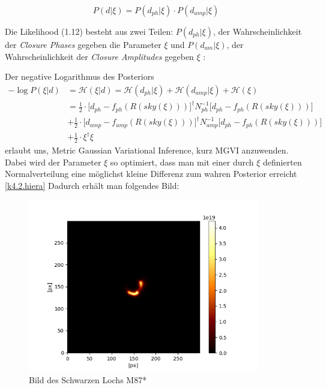 \begin{equation}
P(d|\xi)=  {P(d_{ph}|\xi)\cdot P(d_{amp}|\xi)}    
\end{equation}

Die Likelihood (1.12) besteht aus zwei Teilen: $P(d_{ph}|\xi)$, der Wahrscheinlichkeit der \emph{Closure Phases} gegeben die Parameter $\xi$ und $P(d_{am}| \xi)$, der Wahrscheinlichkeit der \emph{Closure Amplitudes} gegeben $\xi$ : 

Der negative Logarithmus des Posteriors
\begin{align} \label{k4.2.Posterior}
 -\log {P(\xi|d)} &= 
 \mathcal{H} (\xi|d) = \mathcal{H} (d_{ph}|\xi)+\mathcal{H} (d_{amp}|\xi)+\mathcal{H} (\xi) \\
&= \frac {1}{2}\cdot \Bigg[d_{ph} - f_{ph}(R(sky(\xi))) \Bigg]^\dagger N^{-1}_{ph} \Bigg[d_{ph} - f_{ph}(R(sky(\xi))) \Bigg] 
\\  & + \frac {1}{2}\cdot \Bigg[d_{amp} - f_{amp}(R(sky(\xi))) \Bigg]^\dagger N_{amp}^{-1}\Bigg[d_{ph} - f_{ph}(R(sky(\xi))) \Bigg] \nonumber
\\ & +  \frac {1}{2} \cdot \xi^\dagger \xi \nonumber  
\end{align} 
 erlaubt uns, Metric Gaussian Variational Inference, kurz MGVI \parencite{k4.2.mgvi} anzuwenden. Dabei wird der Parameter $\xi$ so optimiert, dass man mit einer durch $\xi$ definierten Normalverteilung eine möglichst kleine Differenz zum wahren Posterior erreicht \cref{k4.2.hiera}
Dadurch erhält man folgendes Bild:

\begin{figure}
    \centering
    \includegraphics[width = 0.9\textwidth]{k4.2/black-hole-lin.png}
    \caption{Bild des Schwarzen Lochs M87*}
    \label{k4.2.black-hole-lin}
\end{figure}





